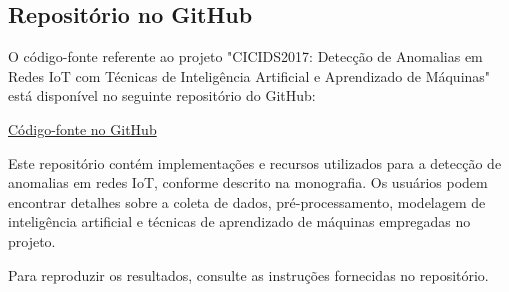 
\begin{apendicesenv}

\partapendices

\chapter{Repositório no GitHub}

O código-fonte referente ao projeto "CICIDS2017: Detecção de Anomalias em Redes IoT com Técnicas de Inteligência Artificial e Aprendizado de Máquinas" está disponível no seguinte repositório do GitHub:

\href{https://github.com/jopdaltro/Cicids2017-Ml/blob/main/IDS/Nova%20pasta/IA.ipynb}{Código-fonte no GitHub}

Este repositório contém implementações e recursos utilizados para a detecção de anomalias em redes IoT, conforme descrito na monografia. Os usuários podem encontrar detalhes sobre a coleta de dados, pré-processamento, modelagem de inteligência artificial e técnicas de aprendizado de máquinas empregadas no projeto.

Para reproduzir os resultados, consulte as instruções fornecidas no repositório.


\end{apendicesenv}
